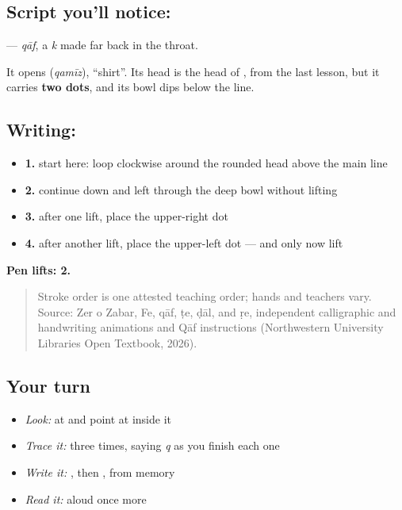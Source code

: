 \subsection*{Script you'll notice: }
\textbf{} — \emph{qāf}, a \emph{k} made far back in the throat.

It opens \textbf{} (\emph{qamīz}), \textquotedblleft{}shirt\textquotedblright{}. Its head is the head of \textbf{}, from the last lesson, but it carries \textbf{two dots}, and its bowl dips below the line.

\subsection*{Writing: }

\begin{itemize}
\raggedright
  \item \textbf{1.} start here: loop clockwise around the rounded head above the main line
  \item \textbf{2.} continue down and left through the deep bowl without lifting
  \item \textbf{3.} after one lift, place the upper-right dot
  \item \textbf{4.} after another lift, place the upper-left dot — and only now lift
\end{itemize}

\textbf{Pen lifts: 2.}

\begin{quote}
Stroke order is one attested teaching order; hands and teachers vary. Source: Zer o Zabar, Fe, qāf, ṭe, ḍāl, and ṛe, independent  calligraphic and handwriting animations and Qāf instructions (Northwestern University Libraries Open Textbook, 2026).
\end{quote}

\subsection*{Your turn}
\begin{itemize}
\raggedright
  \item \emph{Look:} at \textbf{} and point at  inside it
  \item \emph{Trace it:}  three times, saying \emph{q} as you finish each one
  \item \emph{Write it:} , then , from memory
  \item \emph{Read it:} \textbf{} aloud once more
\end{itemize}

